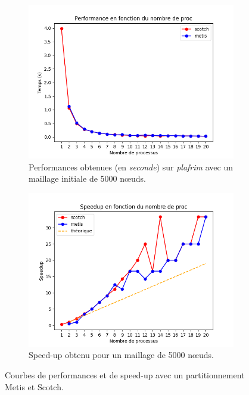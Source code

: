 \documentclass[a4paper,11pt]{article}
\begin{document}
\begin{figure}[H]
	\centering
	\begin{subfigure}{.45\textwidth}
		\centering
		\includegraphics[width=\linewidth]{figures/perf_maillage_5000.png}
		\caption{Performances obtenues (en \textit{seconde}) sur \textit{plafrim} avec un maillage initiale de 5000 n\oe uds.}
		\label{fig:perf_maillage_5000}
	\end{subfigure}    
	\hfill
	\begin{subfigure}{.45\textwidth}
		\centering
		\includegraphics[width=\linewidth]{figures/speedup_maillage_5000.png}
		\caption{Speed-up obtenu pour un maillage de 5000 n\oe uds.}
		\label{fig:speed_up_maillage_5000}
	\end{subfigure}
	
	\caption{Courbes de performances et de speed-up avec un partitionnement Metis et Scotch.}
	\label{fig:perf_speed-up_maillage_5000}
\end{figure}
\end{document}
